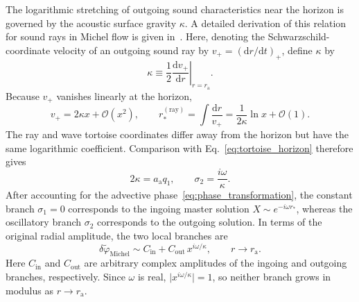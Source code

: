 \documentclass[12pt,a4paper,preprint,nopreprintline]{elsarticle}
\begin{document}
The logarithmic stretching of outgoing sound characteristics near the horizon is governed by the acoustic surface gravity $\kappa$. A detailed derivation of this relation for sound rays in Michel flow is given in~\cite{SemyannikovAV_AcousticGeometryAndSoundRayDynamics_2026}. Here, denoting the Schwarzschild-coordinate velocity of an outgoing sound ray by $v_{+}=(\mathrm{d}r/\mathrm{d}t)_{+}$, define $\kappa$ by
\begin{equation}
    \kappa
    \equiv
    \frac{1}{2}
    \left.
    \frac{\mathrm{d}v_{+}}{\mathrm{d}r}
    \right|_{r=r_{\mathrm{a}}}.
    \label{eq:acoustic_surface_gravity}
\end{equation}
Because $v_{+}$ vanishes linearly at the horizon,
\begin{equation}
    v_{+}=2\kappa x+\mathcal{O}(x^{2}),
    \qquad
    r_{*}^{\mathrm{(ray)}}
    =
    \int\frac{\mathrm{d}r}{v_{+}}
    =
    \frac{1}{2\kappa}\ln x+\mathcal{O}(1).
\end{equation}
The ray and wave tortoise coordinates differ away from the horizon but have the same logarithmic coefficient. Comparison with Eq.~\eqref{eq:tortoise_horizon} therefore gives
\begin{equation}
    2\kappa=a_{\mathrm{a}}q_{1},
    \qquad
    \sigma_{2}=\frac{i\omega}{\kappa}.
    \label{eq:horizon_exponent_surface_gravity}
\end{equation}
After accounting for the advective phase~\eqref{eq:phase_transformation}, the constant branch $\sigma_{1}=0$ corresponds to the ingoing master solution $X\sim e^{-i\omega r_{*}}$, whereas the oscillatory branch $\sigma_{2}$ corresponds to the outgoing solution. In terms of the original radial amplitude, the two local branches are
\begin{equation}
    \delta\widetilde{\varphi}_{\mathrm{Michel}}
    \sim
    C_{\mathrm{in}}
    +
    C_{\mathrm{out}}\,x^{i\omega/\kappa},
    \qquad
    r\rightarrow r_{\mathrm{a}}.
    \label{eq:michel_local_branches}
\end{equation}
Here $C_{\mathrm{in}}$ and $C_{\mathrm{out}}$ are arbitrary complex amplitudes of the ingoing and outgoing branches, respectively. Since $\omega$ is real, $\lvert x^{i\omega/\kappa}\rvert=1$, so neither branch grows in modulus as $r\rightarrow r_{\mathrm{a}}$.
\end{document}
